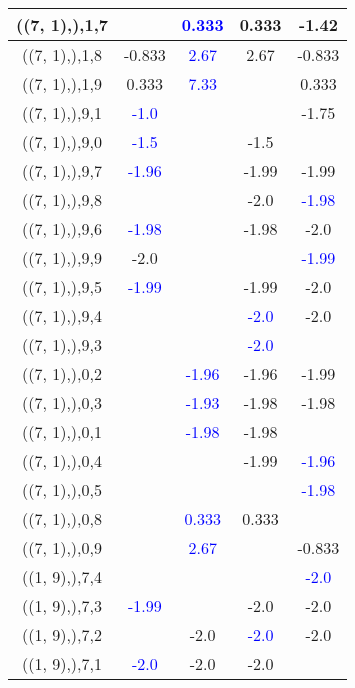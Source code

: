 \documentclass{article}
\begin{document}
\begin{center}
\begin{longtable}{|c|c|c|c|c|}
        	((7, 1),),1,7&& \textcolor{blue}{0.333}&0.333&-1.42\\
        	\hline
        	((7, 1),),1,8&-0.833& \textcolor{blue}{2.67}&2.67&-0.833\\
        	\hline
        	((7, 1),),1,9&0.333& \textcolor{blue}{7.33}&&0.333\\
        	\hline
        	((7, 1),),9,1& \textcolor{blue}{-1.0}&&&-1.75\\
        	\hline
        	((7, 1),),9,0& \textcolor{blue}{-1.5}&&-1.5&\\
        	\hline
        	((7, 1),),9,7& \textcolor{blue}{-1.96}&&-1.99&-1.99\\
        	\hline
        	((7, 1),),9,8&&&-2.0& \textcolor{blue}{-1.98}\\
        	\hline
        	((7, 1),),9,6& \textcolor{blue}{-1.98}&&-1.98&-2.0\\
        	\hline
        	((7, 1),),9,9&-2.0&&& \textcolor{blue}{-1.99}\\
        	\hline
        	((7, 1),),9,5& \textcolor{blue}{-1.99}&&-1.99&-2.0\\
        	\hline
        	((7, 1),),9,4&&& \textcolor{blue}{-2.0}&-2.0\\
        	\hline
        	((7, 1),),9,3&&& \textcolor{blue}{-2.0}&\\
        	\hline
        	((7, 1),),0,2&& \textcolor{blue}{-1.96}&-1.96&-1.99\\
        	\hline
        	((7, 1),),0,3&& \textcolor{blue}{-1.93}&-1.98&-1.98\\
        	\hline
        	((7, 1),),0,1&& \textcolor{blue}{-1.98}&-1.98&\\
        	\hline
        	((7, 1),),0,4&&&-1.99& \textcolor{blue}{-1.96}\\
        	\hline
        	((7, 1),),0,5&&&& \textcolor{blue}{-1.98}\\
        	\hline
        	((7, 1),),0,8&& \textcolor{blue}{0.333}&0.333&\\
        	\hline
        	((7, 1),),0,9&& \textcolor{blue}{2.67}&&-0.833\\
        	\hline
        	((1, 9),),7,4&&&& \textcolor{blue}{-2.0}\\
        	\hline
        	((1, 9),),7,3& \textcolor{blue}{-1.99}&&-2.0&-2.0\\
        	\hline
        	((1, 9),),7,2&&-2.0& \textcolor{blue}{-2.0}&-2.0\\
        	\hline
        	((1, 9),),7,1& \textcolor{blue}{-2.0}&-2.0&-2.0&\\

\end{longtable}
\end{center}
\end{document}
